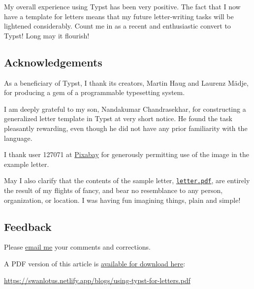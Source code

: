\documentclass[
  a4paper,
]{article}
\begin{document}
My overall experience using Typst has been very positive. The fact that
I now have a template for letters means that my future letter-writing
tasks will be lightened considerably. Count me in as a recent and
enthusiastic convert to Typst! Long may it flourish!

\hypertarget{acknowledgements}{%
\subsection{Acknowledgements}\label{acknowledgements}}

As a beneficiary of Typst, I thank its creators, Martin Haug and Laurenz
Mädje, for producing a gem of a programmable typesetting system.

I am deeply grateful to my son, Nandakumar Chandrasekhar, for
constructing a generalized letter template in Typst at very short
notice. He found the task pleasantly rewarding, even though he did not
have any prior familiarity with the language.

I thank user 127071 at
\href{https://pixabay.com/photos/storm-damage-oak-tree-break-597217/}{Pixabay}
for generously permitting use of the image in the example letter.

May I also clarify that the contents of the sample letter,
\href{auxiliary/letter.pdf}{\texttt{letter.pdf}}, are entirely the
result of my flights of fancy, and bear no resemblance to any person,
organization, or location. I was having fun imagining things, plain and
simple!  \normalfont

\hypertarget{feedback}{%
\subsection{Feedback}\label{feedback}}

Please \href{mailto:feedback.swanlotus@gmail.com}{email me} your
comments and corrections.

\noindent A PDF version of this article is
\href{./using-typst-for-letters.pdf}{available for download here}:

\begin{small}

\begin{sffamily}

\url{https://swanlotus.netlify.app/blogs/using-typst-for-letters.pdf}

\end{sffamily}

\end{small}
\end{document}
